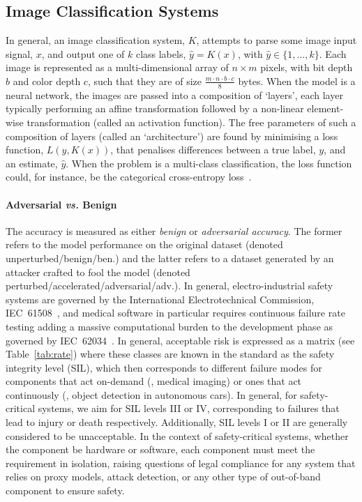 \subsection{Image Classification Systems}
\label{classification}
In general, an image classification system, $K$, attempts to parse some image input signal, $x$, and output one of $k$ class labels, $\hat{y} = K(x)$, with $\hat{y} \in \{1,\ldots,k\}$.
Each image is represented as a multi-dimensional array of $n\times m$ pixels, with bit depth $b$ and color depth $c$, such that they are of size $\frac{m \cdot n \cdot b \cdot c}{8}$ bytes.
When the model is a neural network, the images are passed into a composition of `layers', each layer typically performing an affine transformation followed by a non-linear element-wise transformation (called an activation function).
The free parameters of such a composition of layers (called an `architecture') are found by minimising a loss function, $L(y,K(x))$, that penalises differences between a true label, $y$, and an estimate, $\hat{y}$.
When the problem is a multi-class classification, the loss function could, for instance, be the categorical cross-entropy loss~\cite{biggio_evasion_2013,tsipras_robustness_2019,croce_reliable_2020,carlini_towards_2017}.

\paragraph{Adversarial \textit{vs.} Benign}

The accuracy is measured as either \textit{benign} or \textit{adversarial accuracy}.
The former refers to the model performance on the original dataset (denoted unperturbed/benign/ben.) and the latter refers to a dataset generated by an attacker crafted to fool the model (denoted perturbed/accelerated/adversarial/adv.).
In general, electro-industrial safety systems are governed by the International Electrotechnical Commission, IEC~61508~\cite{IEC61508}, and medical software in particular requires continuous failure rate testing adding a massive computational burden to the development phase as governed by IEC~62034~\cite{IEC62034}.
In general, acceptable risk is expressed as a matrix (see Table~\ref{tab:rate}) where these classes are known in the standard as the safety integrity level (SIL), which then corresponds to different failure modes for components that act on-demand (\eg, medical imaging) or ones that act continuously (\eg, object detection in autonomous cars).
In general, for safety-critical systems, we aim for SIL levels III or IV, corresponding to failures that lead to injury or death respectively.
Additionally, SIL levels I or II are generally considered to be unacceptable.
In the context of safety-critical systems, whether the component be hardware or software, each component must meet the requirement in isolation, raising questions of legal compliance for any system that relies on proxy models, attack detection, or any other type of out-of-band component to ensure safety.



